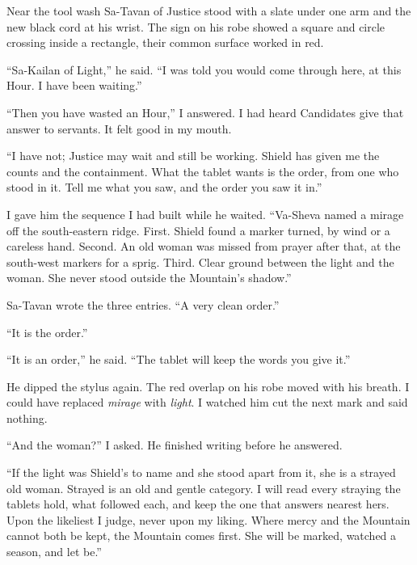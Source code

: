 \ornament 

Near the tool wash Sa-Tavan of Justice stood with a slate under one arm and the new black cord at his wrist. The sign on his robe showed a square and circle crossing inside a rectangle, their common surface worked in red.

``Sa-Kailan of Light,'' he said. ``I was told you would come through here, at this Hour. I have been waiting.'' \par

``Then you have wasted an Hour,'' I answered. I had heard Candidates give that answer to servants. It felt good in my mouth.\par
``I have not; Justice may wait and still be working. Shield has given me the counts and the containment. What the tablet wants is the order, from one who stood in it. Tell me what you saw, and the order you saw it in.''\par

I gave him the sequence I had built while he waited. ``Va-Sheva named a mirage off the south-eastern ridge. First. Shield found a marker turned, by wind or a careless hand. Second. An old woman was missed from prayer after that, at the south-west markers for a sprig. Third. Clear ground between the light and the woman. She never stood outside the Mountain's shadow.''\par

Sa-Tavan wrote the three entries. ``A very clean order.''\par

``It is the order.''\par

``It is an order,'' he said. ``The tablet will keep the words you give it.''\par

He dipped the stylus again. The red overlap on his robe moved with his breath. I could have replaced \textit{mirage} with \textit{light}. I watched him cut the next mark and said nothing.\par

``And the woman?'' I asked. He finished writing before he answered. \par

``If the light was Shield's to name and she stood apart from it, she is a strayed old woman. Strayed is an old and gentle category. I will read every straying the tablets hold, what followed each, and keep the one that answers nearest hers. Upon the likeliest I judge, never upon my liking. Where mercy and the Mountain cannot both be kept, the Mountain comes first. She will be marked, watched a season, and let be.'' \par

